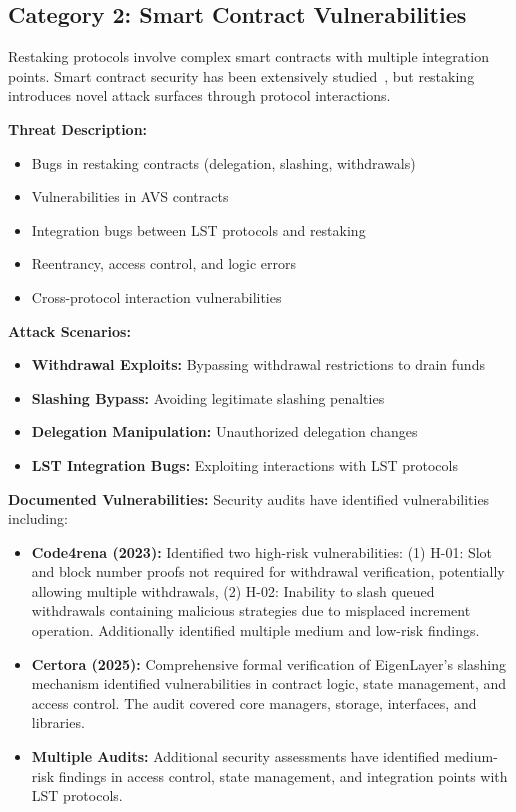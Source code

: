 \documentclass[runningheads]{llncs}
\begin{document}
\subsection{Category 2: Smart Contract Vulnerabilities}

Restaking protocols involve complex smart contracts with multiple integration points. Smart contract security has been extensively studied~\cite{atzei2017survey,huang2021survey,chen2020defining,luu2016making}, but restaking introduces novel attack surfaces through protocol interactions.

\textbf{Threat Description:}
\begin{itemize}
    \item Bugs in restaking contracts (delegation, slashing, withdrawals)~\cite{certora2025,code4rena2023}
    \item Vulnerabilities in AVS contracts~\cite{zhang2024proof}
    \item Integration bugs between LST protocols and restaking~\cite{li2024mitigating}
    \item Reentrancy, access control, and logic errors~\cite{rodler2018sereum,zhang2020smart}
    \item Cross-protocol interaction vulnerabilities~\cite{chen2021sok}
\end{itemize}

\textbf{Attack Scenarios:}
\begin{itemize}
    \item \textbf{Withdrawal Exploits:} Bypassing withdrawal restrictions to drain funds
    \item \textbf{Slashing Bypass:} Avoiding legitimate slashing penalties
    \item \textbf{Delegation Manipulation:} Unauthorized delegation changes
    \item \textbf{LST Integration Bugs:} Exploiting interactions with LST protocols
\end{itemize}

\textbf{Documented Vulnerabilities:}
Security audits have identified vulnerabilities including:
\begin{itemize}
    \item \textbf{Code4rena (2023):} Identified two high-risk vulnerabilities: (1) H-01: Slot and block number proofs not required for withdrawal verification, potentially allowing multiple withdrawals, (2) H-02: Inability to slash queued withdrawals containing malicious strategies due to misplaced increment operation. Additionally identified multiple medium and low-risk findings.
    \item \textbf{Certora (2025):} Comprehensive formal verification of EigenLayer's slashing mechanism identified vulnerabilities in contract logic, state management, and access control. The audit covered core managers, storage, interfaces, and libraries.
    \item \textbf{Multiple Audits:} Additional security assessments have identified medium-risk findings in access control, state management, and integration points with LST protocols.
\end{itemize}
\end{document}
